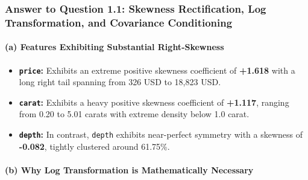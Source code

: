 \begin{tcolorbox}[colback=teal!3!white,colframe=teal!70!black,boxrule=0.7pt,arc=3pt,left=6pt,right=6pt,top=4pt,bottom=4pt,breakable,before upper={\sloppy\raggedright},title=\textbf{\small Notebook Analytical Narrative: Answer to Question 1.1}]
\subsubsection{\texorpdfstring{\textbf{Answer to Question 1.1: Skewness Rectification, Log Transformation, and Covariance Conditioning}}{Answer to Question 1.1: Skewness Rectification, Log Transformation, and Covariance Conditioning}}

\paragraph{\texorpdfstring{\textbf{(a) Features Exhibiting Substantial Right-Skewness}}{(a) Features Exhibiting Substantial Right-Skewness}}

\begin{itemize}
\tightlist
\item
  \textbf{\texttt{price}:} Exhibits an extreme positive skewness coefficient of \textbf{+1.618} with a long right tail spanning from 326 USD to 18,823 USD.
\item
  \textbf{\texttt{carat}:} Exhibits a heavy positive skewness coefficient of \textbf{+1.117}, ranging from 0.20 to 5.01 carats with extreme density below 1.0 carat.
\item
  \textbf{\texttt{depth}:} In contrast, \texttt{depth} exhibits near-perfect symmetry with a skewness of \textbf{-0.082}, tightly clustered around 61.75\%.
\end{itemize}

\paragraph{\texorpdfstring{\textbf{(b) Why Log Transformation is Mathematically Necessary}}{(b) Why Log Transformation is Mathematically Necessary}}


\end{tcolorbox}

